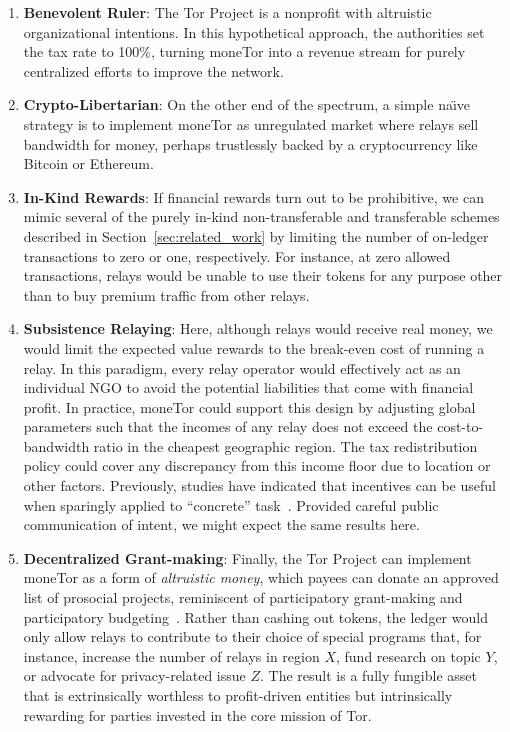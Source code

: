 \begin{enumerate}

\item \textbf{Benevolent Ruler}: The Tor Project is a nonprofit with altruistic organizational intentions.
  In this hypothetical approach, the authorities set the tax rate to 100\%, turning moneTor into a revenue stream for purely centralized efforts to improve the network.

\item \textbf{Crypto-Libertarian}: On the other end of the spectrum, a simple na\"{\i}ve strategy is to implement moneTor as unregulated market where relays sell bandwidth for money, perhaps trustlessly backed by a cryptocurrency like Bitcoin or Ethereum.

\item \textbf{In-Kind Rewards}: If financial rewards turn out to be prohibitive, we can mimic several of the purely in-kind non-transferable and transferable schemes described in Section~\ref{sec:related_work} by limiting the number of on-ledger transactions to zero or one, respectively.
  For instance, at zero allowed transactions, relays would be unable to use their tokens for any purpose other than to buy premium traffic from other relays.

\item \textbf{Subsistence Relaying}: Here, although relays would receive real money, we would limit the expected value rewards to the break-even cost of running a relay.
In this paradigm, every relay operator would effectively act as an individual NGO to avoid the potential liabilities that come with financial profit.
In practice, moneTor could support this design by adjusting global parameters such that the incomes of any relay does not exceed the cost-to-bandwidth ratio in the cheapest geographic region.
The tax redistribution policy could cover any discrepancy from this income floor due to location or other factors.
Previously, studies have indicated that incentives can be useful when sparingly applied to ``concrete'' task~\cite{10.1257/jep.25.4.191, 10.1086/431263}.
Provided careful public communication of intent, we might expect the same results here.

\item \textbf{Decentralized Grant-making}: Finally, the Tor Project can implement moneTor as a form of \emph{altruistic money}, which payees can donate an approved list of prosocial projects, reminiscent of participatory grant-making and participatory budgeting~\cite{dinh2020universal}.
Rather than cashing out tokens, the ledger would only allow relays to contribute to their choice of special programs that, for instance, increase the number of relays in region $X$, fund research on topic $Y$, or advocate for privacy-related issue $Z$.
The result is a fully fungible asset that is extrinsically worthless to profit-driven entities but intrinsically rewarding for parties invested in the core mission of Tor.

\end{enumerate}

